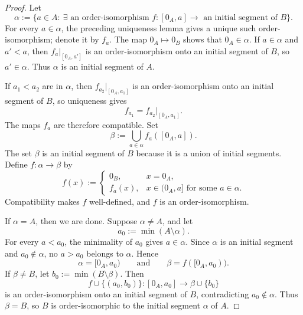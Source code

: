 \begin{proof}
Let
\[
\alpha:=\{a\in A:\ \exists\text{ an order-isomorphism }f:[0_A,a]\to\text{ an initial segment of }B\}.
\]
For every $a\in\alpha$, the preceding uniqueness lemma gives a unique such order-isomorphism; denote it by $f_a$.
The map $0_A\mapsto 0_B$ shows that $0_A\in\alpha$. If $a\in\alpha$ and $a'<a$, then $f_a|_{[0_A,a']}$ is an order-isomorphism onto an initial segment of $B$, so $a'\in\alpha$. Thus $\alpha$ is an initial segment of $A$.

If $a_1<a_2$ are in $\alpha$, then $f_{a_2}|_{[0_A,a_1]}$ is an order-isomorphism onto an initial segment of $B$, so uniqueness gives
\[
f_{a_1}=f_{a_2}|_{[0_A,a_1]}.
\]
The maps $f_a$ are therefore compatible. Set
\[
\beta:=\bigcup_{a\in\alpha}f_a([0_A,a]).
\]
The set $\beta$ is an initial segment of $B$ because it is a union of initial segments. Define $f:\alpha\to\beta$ by
\[
f(x):=
\begin{cases}
0_B, & x=0_A,\\
f_a(x), & x\in(0_A,a]\text{ for some }a\in\alpha.
\end{cases}
\]
Compatibility makes $f$ well-defined, and $f$ is an order-isomorphism.

If $\alpha=A$, then we are done. Suppose $\alpha\neq A$, and let
\[
a_0:=\min(A\setminus\alpha).
\]
For every $a<a_0$, the minimality of $a_0$ gives $a\in\alpha$. Since $\alpha$ is an initial segment and $a_0\notin\alpha$, no $a>a_0$ belongs to $\alpha$. Hence
\[
\alpha=[0_A,a_0)\qquad\text{and}\qquad \beta=f([0_A,a_0)).
\]
If $\beta\neq B$, let $b_0:=\min(B\setminus\beta)$. Then
\[
f\cup\{(a_0,b_0)\}:[0_A,a_0]\longrightarrow \beta\cup\{b_0\}
\]
is an order-isomorphism onto an initial segment of $B$, contradicting $a_0\notin\alpha$. Thus $\beta=B$, so $B$ is order-isomorphic to the initial segment $\alpha$ of $A$.
\end{proof}


\fi

\ifdefined\stopbeforeaxiomofchoice
  \expandafter\endinput
\fi

\subsection{Axiom of Choice}

The most commonly used axiomatic system for mathematics is the Zermelo-Fraenkel set theory (ZF).
\begin{itemize}
  \item ZFC with the Axiom of Choice 
  \item ZF without the Axiom of Choice 
\end{itemize}

